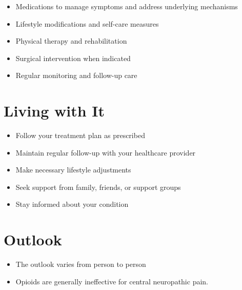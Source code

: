 \begin{itemize}[noitemsep]
  \item Medications to manage symptoms and address underlying mechanisms
  \item Lifestyle modifications and self-care measures
  \item Physical therapy and rehabilitation
  \item Surgical intervention when indicated
  \item Regular monitoring and follow-up care
\end{itemize}
\section{Living with It}
\begin{itemize}[noitemsep]
  \item Follow your treatment plan as prescribed
  \item Maintain regular follow-up with your healthcare provider
  \item Make necessary lifestyle adjustments
  \item Seek support from family, friends, or support groups
  \item Stay informed about your condition
\end{itemize}
\section{Outlook}
\begin{itemize}[noitemsep]
  \item The outlook varies from person to person
  \item Opioids are generally ineffective for central neuropathic pain.
\end{itemize}
